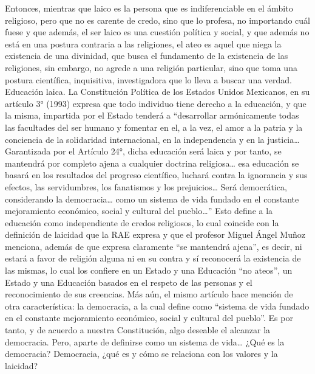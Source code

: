 Entonces, mientras que laico es la persona que es indiferenciable en el ámbito religioso, pero que no es carente de credo, sino que lo profesa, no importando cuál fuese y que además, el ser laico es una cuestión política y social, y que además no está en una postura contraria a las religiones, el ateo es aquel que niega la existencia de una divinidad, que busca el fundamento de la existencia de las religiones, sin embargo, no agrede a una religión particular, sino que toma una postura científica, inquisitiva, investigadora que lo lleva a buscar una verdad.
Educación laica.
La Constitución Política de los Estados Unidos Mexicanos, en su artículo 3° (1993) expresa que todo individuo tiene derecho a la educación, y que la misma, impartida por el Estado tenderá a “desarrollar armónicamente todas las facultades del ser humano y fomentar en el, a la vez, el amor a la patria y la conciencia de la solidaridad internacional, en la independencia y en la justicia… Garantizada por el Artículo 24°, dicha educación será laica y por tanto, se mantendrá por completo ajena a cualquier doctrina religiosa… esa educación se basará en los resultados del progreso científico, luchará contra la ignorancia y sus efectos, las servidumbres, los fanatismos y los prejuicios… Será democrática, considerando la democracia… como un sistema de vida fundado en el constante mejoramiento económico, social y cultural del pueblo…” Esto define a la educación como independiente de credos religiosos, lo cual coincide con la definición de laicidad que la RAE expresa y que el profesor Miguel Ángel Muñoz menciona, además de que expresa claramente “se mantendrá ajena”, es decir, ni estará a favor de religión alguna ni en su contra y sí reconocerá la existencia de las mismas, lo cual los confiere en un Estado y una Educación “no ateos”, un Estado y una Educación basados en el respeto de las personas y el reconocimiento de sus creencias. Más aún, el mismo artículo hace mención de otra característica: la democracia, a la cual define como “sistema de vida fundado en el constante mejoramiento económico, social y cultural del pueblo”. Es por tanto, y de acuerdo a nuestra Constitución, algo deseable el alcanzar la democracia. Pero, aparte de definirse como un sistema de vida… ¿Qué es la democracia?
Democracia, ¿qué es y cómo se relaciona con los valores y la laicidad?
